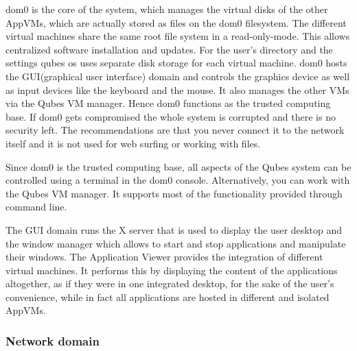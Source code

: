 \documentclass[runningheads,a4paper]{article}
\begin{document}
dom0 is the core of the system, which manages the virtual disks of the
other AppVMs, which are actually stored as files on the dom0
filesystem. The different virtual machines share the same root file
system in a read-only-mode. This allows centralized software
installation and updates. For the user's directory and the settings
qubes os uses separate disk storage for each virtual machine. 
dom0 hosts the GUI(graphical user interface) domain and controls the
graphics device as well as input devices like the keyboard and the
mouse. It also manages the other VMs via the Qubes VM manager. Hence
dom0 functions as the trusted computing base. If dom0 gets compromised
the whole system is corrupted and there is no security left. The
recommendations are that you never connect it to the network itself and
it is not used for web surfing or working with files.

Since dom0 is the trusted computing base, all aspects of the Qubes
system can be controlled using a terminal in the dom0 console. 
Alternatively, you can work with the Qubes VM
manager. It supports most of the functionality provided through
command line. 

The GUI domain runs the X server that is used to display the user desktop and
the window manager which allows to start and stop applications and
manipulate their windows. The Application Viewer provides the
integration of different virtual machines. It performs this by displaying the
content of the applications altogether, as if they were in one integrated desktop, for
the sake of the user's convenience, while in fact all applications are hosted in different and isolated AppVMs.


\subsubsection{Network domain}
\end{document}
